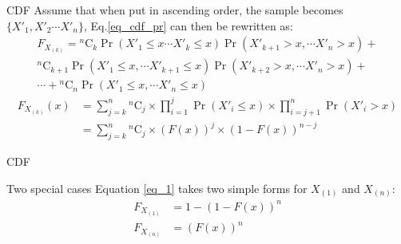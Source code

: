 \documentclass{beamer}
\newcommand{\comb}[2]{{}^{#1}\mathrm{C}_{#2}}
\providecommand{\brak}[1]{\ensuremath{\left(#1\right)}}
\providecommand{\pr}[1]{\ensuremath{\Pr\left(#1\right)}}
\begin{document}
\begin{frame}{CDF}
Assume that when put in ascending order, the sample becomes $\{X'_1, X'_2\cdots X'_n\}$,
Eq.\eqref{eq_cdf_pr} can then be rewritten as:
\begin{multline}
    F_{X_{(k)}}=\comb{n}{k}\pr{X'_1\leq x\cdots X'_k\leq x}\pr{X'_{k+1}>x,\cdots X'_{n}>x}+\\
    \comb{n}{k+1}\pr{X'_1\leq x, \cdots X'_{k+1}\leq x}\pr{X'_{k+2}>x,\cdots X'_{n}>x}+\\
    \cdots+\comb{n}{n} \pr{X'_{1}\leq x, \cdots X'_{n}\leq x}
\end{multline}
\begin{align}
    F_{X_{(k)}}(x)&= \sum_{j=k}^{n}\comb{n}{j}\times \prod_{i=1}^{j}\pr{X'_i\leq x} \times\prod_{i=j+1}^{n}\pr{X'_i> x}\\
    &= \sum_{j=k}^{n}\comb{n}{j}\times \brak{F(x)}^{j}\times\brak{1-F(x)}^{n-j}\label{eq_1}
\end{align}    


\end{frame}
\begin{frame}{CDF}
\begin{block}{Two special cases}
    Equation \eqref{eq_1} takes two simple forms for $X_{(1)}$ and $X_{(n)}$:
\begin{align}
    F_{X_{(1)}}&=1-(1-F(x))^n\\
    F_{X_{(n)}}&=(F(x))^n
\end{align}
\end{block}
\end{frame}
\end{document}
